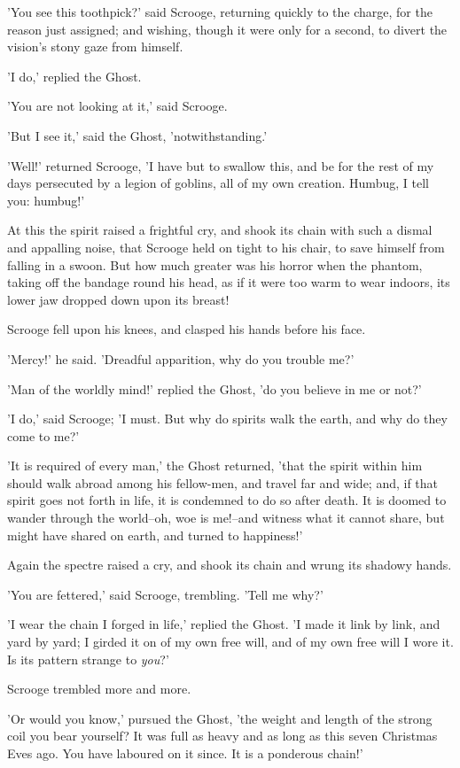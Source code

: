 'You see this toothpick?' said Scrooge, returning quickly to the charge,
for the reason just assigned; and wishing, though it were only for a
second, to divert the vision's stony gaze from himself.

'I do,' replied the Ghost.

'You are not looking at it,' said Scrooge.

'But I see it,' said the Ghost, 'notwithstanding.'

'Well!' returned Scrooge, 'I have but to swallow this, and be for the
rest of my days persecuted by a legion of goblins, all of my own
creation. Humbug, I tell you: humbug!'

At this the spirit raised a frightful cry, and shook its chain with such
a dismal and appalling noise, that Scrooge held on tight to his chair,
to save himself from falling in a swoon. But how much greater was his
horror when the phantom, taking off the bandage round his head, as if it
were too warm to wear indoors, its lower jaw dropped down upon its
breast!

Scrooge fell upon his knees, and clasped his hands before his face.

'Mercy!' he said. 'Dreadful apparition, why do you trouble me?'

'Man of the worldly mind!' replied the Ghost, 'do you believe in me or
not?'

'I do,' said Scrooge; 'I must. But why do spirits walk the earth, and
why do they come to me?'

'It is required of every man,' the Ghost returned, 'that the spirit
within him should walk abroad among his fellow-men, and travel far and
wide; and, if that spirit goes not forth in life, it is condemned to do
so after death. It is doomed to wander through the world--oh, woe is
me!--and witness what it cannot share, but might have shared on earth,
and turned to happiness!'

Again the spectre raised a cry, and shook its chain and wrung its
shadowy hands.

'You are fettered,' said Scrooge, trembling. 'Tell me why?'

'I wear the chain I forged in life,' replied the Ghost. 'I made it link
by link, and yard by yard; I girded it on of my own free will, and of
my own free will I wore it. Is its pattern strange to \emph{you}?'

Scrooge trembled more and more.

'Or would you know,' pursued the Ghost, 'the weight and length of the
strong coil you bear yourself? It was full as heavy and as long as this
seven Christmas Eves ago. You have laboured on it since. It is a
ponderous chain!'

